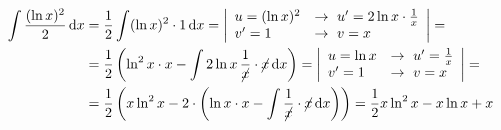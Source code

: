 \documentclass[11pt,a4paper]{article}
\newcommand{\dx}{\,\mathrm{d}x}
\begin{document}
\begin{tcolorbox}[colframe=blue!60!black, colback=white, coltitle=white, fonttitle=\bfseries, title={$*$ Pomocný výpočet:}, sharp corners]
\begin{align*}
\int\frac{(\ln x)^2}{2}\dx &= \frac12\int(\ln x)^2\cdot1\dx =
\left|\begin{array}{ll} u=(\ln x)^2 & \to\ u'=2\ln x\cdot\frac1x\\ v'=1 & \to\ v=x\end{array}\right| =\\
&= \frac12\left(\ln^2x\cdot x-\int2\ln x\,\frac{1}{\cancel{x}}\cdot\cancel{x}\dx\right) =
\left|\begin{array}{ll} u=\ln x & \to\ u'=\frac1x\\ v'=1 & \to\ v=x\end{array}\right| =\\
&= \frac12\left(x\ln^2x-2\cdot\left(\ln x\cdot x-\int\frac{1}{\cancel{x}}\cdot\cancel{x}\dx\right)\right)
= \frac12x\ln^2x-x\ln x+x
\end{align*}
\end{tcolorbox}
\end{document}
